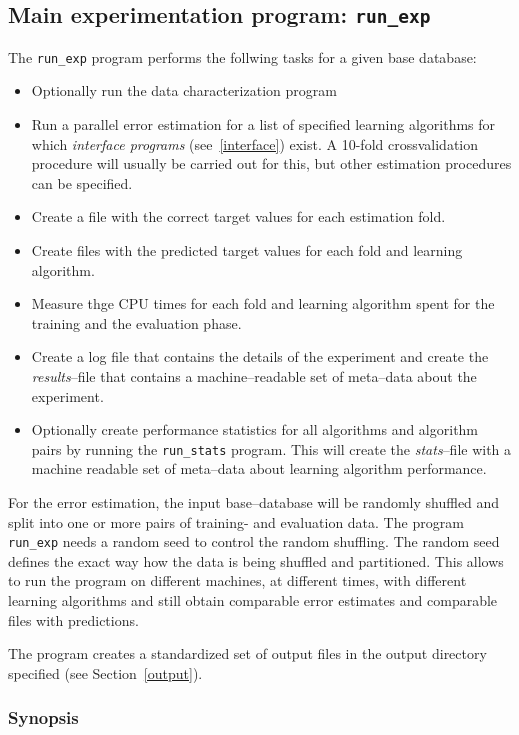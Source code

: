 \documentclass[a4paper,10pt,twoside]{article}
\begin{document}
\subsection{Main experimentation program: \texttt{run\_exp}}

The \texttt{run\_exp} program performs the follwing tasks for
a given base database:
\begin{itemize}
\item Optionally run the data characterization program
\item Run a parallel error estimation for a list of specified
  learning algorithms for which \emph{interface programs} 
  (see~\ref{interface}) exist. A 10-fold crossvalidation
  procedure will usually be carried out for this, but
  other estimation procedures can be specified.
\item Create a file with the correct target values for each
  estimation fold.
\item Create files with the predicted target values for 
  each fold and learning algorithm.
\item Measure thge CPU times for each fold and learning algorithm
  spent for the training and the evaluation phase.
\item Create a log file that contains the details of the 
  experiment and create the \emph{results}--file that 
  contains a machine--readable set of meta--data about the
  experiment.
\item Optionally create performance statistics for all algorithms
  and algorithm pairs by running the \texttt{run\_stats} program.
  This will create the \emph{stats}--file with a machine readable
  set of meta--data about learning algorithm performance.
\end{itemize}

For the error estimation, the input base--database will be 
randomly shuffled and split into one or more pairs of training-
and evaluation data. The program \texttt{run\_exp} needs 
a random seed to control the random shuffling. The random seed
defines the exact way how the data is being shuffled and
partitioned. This allows to run the program on different
machines, at different times, with different learning algorithms
and still obtain comparable error estimates and comparable 
files with predictions.

The program creates a standardized set of output files in
the output directory specified (see Section~\ref{output}).
\enlargethispage{1em}

\subsubsection{Synopsis}
\end{document}
